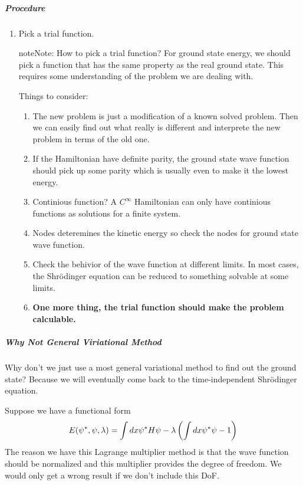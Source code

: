 \documentclass[letterpaper,10pt,english]{sphinxmanual}
\begin{document}
\subparagraph{Procedure}
\label{Quantum/approx:procedure}\begin{enumerate}
\item {} 
Pick a trial function.

\begin{notice}{note}{Note:}
How to pick a trial function? For ground state energy, we should pick a function that has the same property as the real ground state. This requires some understanding of the problem we are dealing with.

Things to consider:
\begin{enumerate}
\item {} 
The new problem is just a modification of a known solved problem. Then we can easily find out what really is different and interprete the new problem in terms of the old one.

\item {} 
If the Hamiltonian have definite parity, the ground state wave function should pick up some parity which is usually even to make it the lowest energy.

\item {} 
Continious function? A \(C^\infty\) Hamiltonian can only have continious functions as solutions for a finite system.

\item {} 
Nodes deteremines the kinetic energy so check the nodes for ground state wave function.

\item {} 
Check the behivior of the wave function at different limits. In most cases, the Shrödinger equation can be reduced to something solvable at some limits.

\item {} 
\textbf{One more thing, the trial function should make the problem calculable.}

\end{enumerate}
\end{notice}

\end{enumerate}


\subparagraph{Why Not General Viriational Method}
\label{Quantum/approx:why-not-general-viriational-method}
Why don't we just use a most general variational method to find out the ground state? Because we will eventually come back to the time-independent Shrödinger equation.

Suppose we have a functional form
\begin{gather}
\begin{split}E(\psi^*, \psi, \lambda) = \int dx \psi^* H \psi - \lambda \left( \int dx \psi^* \psi - 1 \right)\end{split}\notag
\end{gather}
The reason we have this Lagrange multiplier method is that the wave function should be normalized and this multiplier provides the degree of freedom. We would only get a wrong result if we don't include this DoF.
\end{document}
